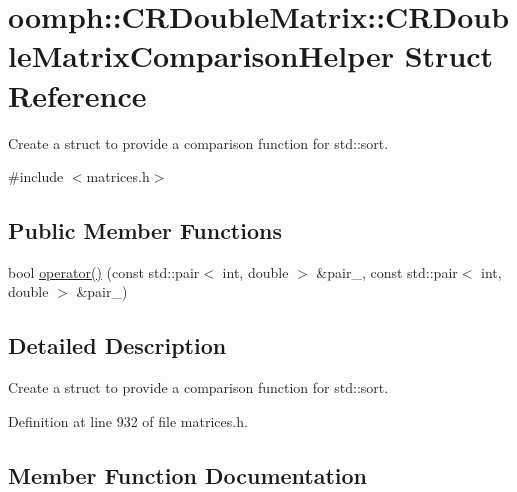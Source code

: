 \hypertarget{structoomph_1_1CRDoubleMatrix_1_1CRDoubleMatrixComparisonHelper}{}\section{oomph\+:\+:C\+R\+Double\+Matrix\+:\+:C\+R\+Double\+Matrix\+Comparison\+Helper Struct Reference}
\label{structoomph_1_1CRDoubleMatrix_1_1CRDoubleMatrixComparisonHelper}


Create a struct to provide a comparison function for std\+::sort.  




{\ttfamily \#include $<$matrices.\+h$>$}

\subsection*{Public Member Functions}
\begin{DoxyCompactItemize}
\item 
bool \hyperlink{structoomph_1_1CRDoubleMatrix_1_1CRDoubleMatrixComparisonHelper_a7ea8ef5909b1303f91e5a5c5d26c61cd}{operator()} (const std\+::pair$<$ int, double $>$ \&pair\+\_, const std\+::pair$<$ int, double $>$ \&pair\+\_)
\end{DoxyCompactItemize}


\subsection{Detailed Description}
Create a struct to provide a comparison function for std\+::sort. 

Definition at line 932 of file matrices.\+h.



\subsection{Member Function Documentation}
\mbox{\label{structoomph_1_1CRDoubleMatrix_1_1CRDoubleMatrixComparisonHelper_a7ea8ef5909b1303f91e5a5c5d26c61cd}} 
